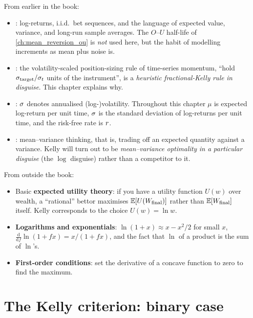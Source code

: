 \begin{backgroundbox}[Prerequisites]
From earlier in the book:
\begin{itemize}
  \item {}: log-returns, i.i.d.\ bet
  sequences, and the language of expected value, variance, and
  long-run sample averages. The $O$--$U$ half-life of
  \cref{ch:mean_reversion_ou} is \emph{not} used here, but the
  habit of modelling increments as mean plus noise is.
  \item {}: the volatility-scaled position-sizing
  rule of time-series momentum, ``hold $\sigma_{\text{target}}
  / \sigma_t$ units of the instrument'', is a \emph{heuristic
  fractional-Kelly rule in disguise}. This chapter explains why.
  \item {}: $\sigma$ denotes annualised
  (log-)volatility. Throughout this chapter $\mu$ is expected
  log-return per unit time, $\sigma$ is the standard deviation of
  log-returns per unit time, and the risk-free rate is $r$.
  \item {}: mean--variance thinking, that
  is, trading off an expected quantity against a variance. Kelly will
  turn out to be \emph{mean--variance optimality in a particular
  disguise} (the $\log$ disguise) rather than a competitor to it.
\end{itemize}
From outside the book:
\begin{itemize}
  \item Basic \textbf{expected utility theory}: if you have a
  utility function $U(w)$ over wealth, a ``rational'' bettor
  maximises $\mathbb{E}[U(W_{\text{final}})]$ rather than
  $\mathbb{E}[W_{\text{final}}]$ itself. Kelly corresponds to the choice
  $U(w) = \ln w$.
  \item \textbf{Logarithms and exponentials}: $\ln(1+x) \approx x
  - x^2/2$ for small $x$, $\frac{\mathrm d}{\mathrm df}\ln(1+fx) =
  x/(1+fx)$, and the fact that $\ln$ of a product is the sum of
  $\ln$'s.
  \item \textbf{First-order conditions}: set the derivative of a
  concave function to zero to find the maximum.
\end{itemize}
\end{backgroundbox}

\section{The Kelly criterion: binary case}
\label{sec:kelly_binary}

